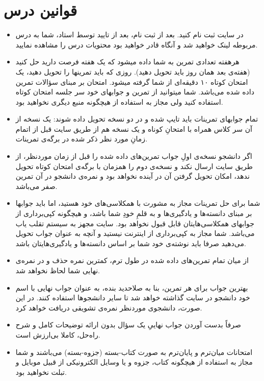 \documentclass[a4paper]{arman-syllabus}
\begin{document}
{\section*{قوانین درس}
\begin{itemize}
\item در سایت  ثبت نام کنید. بعد از ثبت نام،‌ بعد از تایید توسط استاد، شما به درس مربوطه لینک خواهید شد و آنگاه قادر خواهید بود محتویات درس را مشاهده نمایید.
\item هرهفته تعدادی تمرین به شما داده میشود که یک هفته فرصت دارید حل کنید (هفته‌ی بعد همان روز باید تحویل دهید). روزی که باید تمرینها را تحویل دهید، یک امتحان کوتاه ۱۰ دقیقه‌ای از شما گرفته میشود. امتحان بر مبنای سؤالات تمرین داده شده می‌باشد. شما میتوانید از تمرین و جوابهای خود سر جلسه امتحان کوتاه استفاده کنید ولی مجاز به استفاده از هیچگونه منبع دیگری نخواهید بود.
\item تمام جوابهای تمرینات باید تایپ‌ شده و در دو نسخه تحویل داده شوند: یک نسخه از آن سر کلاس همراه با امتحانِ کوناه و یک نسخه هم از طریق سایت  قبل از  اتمام زمانِ مورد نظر ذکر شده در برگه‌ی تمرینات. 
\item اگر دانشجو نسخه‌ی اولِ جواب تمرین‌های داده شده را قبل از زمان موردنظر، از طریق سایت ارسال نکند و نسخه‌ی دوم را همزمان با برگه‌ی امتحان کوتاه تحویل ندهد، امکان تحویل گرفتن آن در آینده نخواهد بود و نمره‌ی دانشجو در آن تمرین صفر می‌باشد.
\item شما برای حل تمرینات مجاز به مشورت با همکلاسی‌های خود  هستید، اما باید جوابها بر مبنای دانسته‌ها و یادگیری‌ها و به قلمِ خودِ شما باشد، و هیچگونه کپی‌برداری از جوابهای همکلاسی‌هایتان قابل قبول نخواهد بود. سایت  مجهز به سیستم تقلب‌ یاب  می‌باشد. شما مجاز به کپی‌برداری از اینترنت نیستید و آنچه به عنوان جواب تحویل می‌دهید صرفا باید نوشته‌ی خود شما بر اساس دانسته‌ها و یادگیری‌هایتان باشد.
\item از میان تمام تمرین‌های داده شده در طول ترم، کمترین نمره حذف و در نمره‌ی نهایی شما لحاظ نخواهد شد.
\item بهترین جواب برای هر تمرین، بنا به صلاحدید بنده، به عنوان جواب نهایی با اسم خود دانشجو در سایت گذاشته خواهد شد تا سایر دانشجوها استفاده کنند. در این صورت، دانشجوی موردنظر نمره‌ی تشویقی دریافت خواهد کرد.
\item صرفاً بدست آوردن جواب نهاییِ یک سؤال بدون ارائه توضیحات کامل و شرح راه‌حل، کاملا بی‌ارزش است. 
\item امتحانات میان‌ترم و پایان‌ترم به صورت کتاب-بسته (جزوه-بسته) می‌باشند و شما مجاز به استفاده از هیچگونه کتاب، جزوه و یا وسایل الکترونیکی از قبیل موبایل و تبلت نخواهید بود.
\end{itemize}


}
\end{document}
